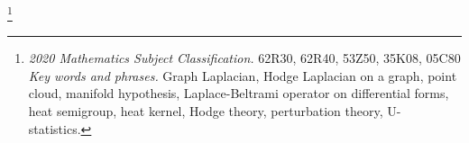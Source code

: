 \documentclass[10pt]{article}
\newcommand\blfootnote[1]{%
  \begingroup
  \renewcommand\thefootnote{}\footnote{#1}%
  \addtocounter{footnote}{-1}%
  \endgroup
}
\theoremstyle{plain}
\theoremstyle{definition}
\theoremstyle{remark}
\begin{document}
\date{}
\maketitle
\blfootnote{\textit{2020 Mathematics Subject Classification.} 62R30, 62R40, 53Z50, 35K08, 05C80 \newline
\textit{Key words and phrases.} Graph Laplacian, Hodge Laplacian on a graph, point cloud, manifold hypothesis, Laplace-Beltrami operator on differential forms, heat semigroup, heat kernel, Hodge theory, perturbation theory, U-statistics.
}
\begin{abstract}
Given i.i.d.~observations uniformly distributed on a closed submanifold of the Euclidean space, we study higher-order generalizations of graph Laplacians, so-called Hodge Laplacians on graphs, as approximations of the Laplace-Beltrami operator on differential forms. Our main result is a high-probability error bound for the associated Dirichlet forms. This bound improves existing Dirichlet form error bounds for graph Laplacians in the context of Laplacian Eigenmaps, and it provides insights into the Betti numbers studied in topological data analysis and the complementing positive part of the spectrum.
\end{abstract}


\end{document}
